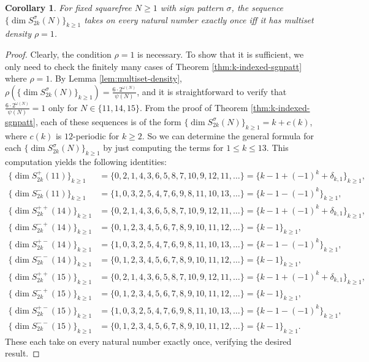 \documentclass[12pt,letterpaper,reqno]{amsart}
\newtheorem{corollary}[theorem]{Corollary}
\theoremstyle{definition}
\numberwithin{equation}{section}
\numberwithin{figure}{section}
\numberwithin{table}{section}
\begin{document}
{
\renewcommand{\thecorollary}{\ref{cor:k-indexed-sgnpatt}}
\begin{corollary}
For fixed squarefree $N \ge 1$ with sign pattern $\sigma$, the sequence $\{ \dim S_{2k}^\sigma(N) \}_{k\ge1}$ takes on every natural number exactly once iff it has multiset density $\rho = 1$.
\end{corollary}
\addtocounter{theorem}{-1}
}
\begin{proof}
    Clearly, the condition $\rho = 1$ is necessary. To show that it is sufficient, we only need to check the finitely many cases of Theorem \ref{thm:k-indexed-sgnpatt} where $\rho = 1$. By Lemma \ref{lem:multiset-density}, $\rho(\{ \dim S_{2k}^\sigma(N) \}_{k\ge1}) = \frac{6\cdot 2^{\omega(N)}}{\psi(N)}$, and it is straightforward to verify that $\frac{6\cdot 2^{\omega(N)}}{\psi(N)} = 1$ only for $N \in \{11,14,15\}$. From the proof of Theorem \ref{thm:k-indexed-sgnpatt}, each of these sequences is of the form $\{ \dim S_{2k}^\sigma(N) \}_{k\ge1} = k + c(k)$, where $c(k)$ is $12$-periodic for $k\ge2$. So we can determine the general formula for each $\{ \dim S_{2k}^\sigma(N) \}_{k\ge1}$ by just computing the terms for $1\le k \le 13$. This computation \cite{ross-code} yields the following identities:
    \begin{align*}
        \{ \dim S_{2k}^{+}(11) \}_{k\ge1}
        &= \{0, 2, 1, 4, 3, 6, 5, 8, 7, 10, 9, 12, 11,\ldots\} = \{k-1+(-1)^k+\delta_{k,1}\}_{k\ge1}, \\
        \{ \dim S_{2k}^{-}(11) \}_{k\ge1}
        &= \{1, 0, 3, 2, 5, 4, 7, 6, 9, 8, 11, 10, 13,\ldots\} = \{k-1-(-1)^k\}_{k\ge1}, \\
        \{ \dim S_{2k}^{++}(14) \}_{k\ge1} 
        &= \{0, 2, 1, 4, 3, 6, 5, 8, 7, 10, 9, 12, 11,\ldots\} = \{k-1+(-1)^k+\delta_{k,1}\}_{k\ge1}, \\
        \{ \dim S_{2k}^{-+}(14) \}_{k\ge1} 
        &= \{0, 1, 2, 3, 4, 5, 6, 7, 8, 9, 10, 11, 12,\ldots\} = \{k-1\}_{k\ge1}, \\
        \{ \dim S_{2k}^{+-}(14) \}_{k\ge1} 
        &= \{1, 0, 3, 2, 5, 4, 7, 6, 9, 8, 11, 10, 13,\ldots\} = \{k-1-(-1)^k\}_{k\ge1}, \\
        \{ \dim S_{2k}^{--}(14) \}_{k\ge1} 
        &= \{0, 1, 2, 3, 4, 5, 6, 7, 8, 9, 10, 11, 12,\ldots\} = \{k-1\}_{k\ge1}, \\
        \{ \dim S_{2k}^{++}(15) \}_{k\ge1} 
        &= \{0, 2, 1, 4, 3, 6, 5, 8, 7, 10, 9, 12, 11,\ldots\} = \{k-1+(-1)^k+\delta_{k,1}\}_{k\ge1}, \\
        \{ \dim S_{2k}^{-+}(15) \}_{k\ge1} 
        &= \{0, 1, 2, 3, 4, 5, 6, 7, 8, 9, 10, 11, 12,\ldots\} = \{k-1\}_{k\ge1}, \\
        \{ \dim S_{2k}^{+-}(15) \}_{k\ge1} 
        &= \{1, 0, 3, 2, 5, 4, 7, 6, 9, 8, 11, 10, 13,\ldots\} = \{k-1-(-1)^k\}_{k\ge1}, \\
        \{ \dim S_{2k}^{--}(15) \}_{k\ge1} 
        &= \{0, 1, 2, 3, 4, 5, 6, 7, 8, 9, 10, 11, 12,\ldots\} = \{k-1\}_{k\ge1}.
    \end{align*}
    These each take on every natural number exactly once, verifying the desired result.
\end{proof}
\end{document}
